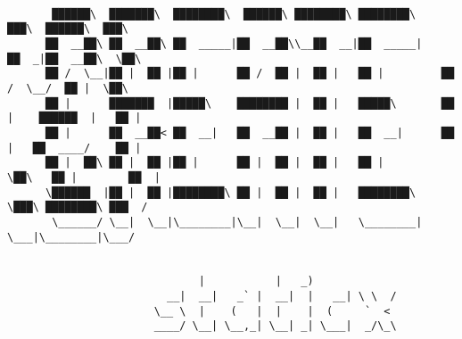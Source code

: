 \documentclass[varwidth=\maxdimen,margin=0.5cm,multi={verbatim}]{standalone}
\begin{document}
\begin{verbatim}

       ██████\  ███████\  ████████\  ██████\ ████████\ ████████\      ███\  ██████\  ███\
      ██  __██\ ██  __██\ ██  _____|██  __██\\__██  __|██  _____|    ██  _|██  __██\  \██\
      ██ /  \__|██ |  ██ |██ |      ██ /  ██ |  ██ |   ██ |         ██  /  \__/  ██ |  \██\
      ██ |      ███████  |█████\    ████████ |  ██ |   █████\       ██ |    ██████  |   ██ |
      ██ |      ██  __██< ██  __|   ██  __██ |  ██ |   ██  __|      ██ |   ██  ____/    ██ |
      ██ |  ██\ ██ |  ██ |██ |      ██ |  ██ |  ██ |   ██ |         \██\   ██ |        ██  |
      \██████  |██ |  ██ |████████\ ██ |  ██ |  ██ |   ████████\     \███\ ████████\ ███  /
       \______/ \__|  \__|\________|\__|  \__|  \__|   \________|      \___|\________|\___/


                              |           |   _)
                         __|  __|   _` |  __|  |   __| \ \  /
                       \__ \  |    (   |  |    |  (     `  <
                       ____/ \__| \__,_| \__| _| \___|  _/\_\



\end{verbatim}
\end{document}
